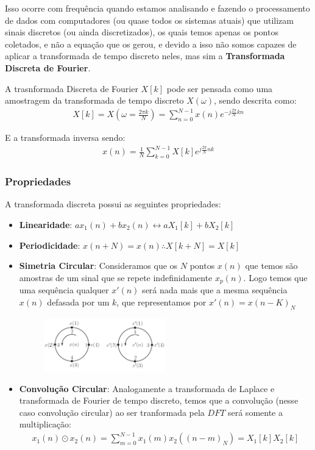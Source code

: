 \documentclass{article}
\begin{document}
Isso ocorre com frequência quando estamos analisando e fazendo o processamento de dados com computadores (ou quase todos os sistemas atuais) que utilizam sinais discretos (ou ainda discretizados), os quais temos apenas os pontos coletados, e não a equação que os gerou, e devido a isso não somos capazes de aplicar a transformada de tempo discreto neles, mas sim a \textbf{Transformada Discreta de Fourier}.

A trasnformada Discreta de Fourier $X[k]$ pode ser pensada como uma amostragem da transformada de tempo discreto $X(\omega)$, sendo descrita como:
\begin{align}
    X[k] = X\left(\omega = \frac{2\pi k}{N}\right) = \sum^{N-1}_{n = 0} x(n) e^{-j\frac{2\pi}{N}kn}
\end{align}

E a transformada inversa sendo:
\begin{align}
    x(n) = \frac{1}{N}\sum^{N-1}_{k = 0} X[k]e^{j \frac{2\pi}{N}nk}
\end{align}

\subsubsection{Propriedades}
A transformada discreta possui as seguintes propriedades:
\begin{itemize}
    \item \textbf{Linearidade}: $ax_1(n) + bx_2(n) \longleftrightarrow aX_1[k] + bX_2[k]$
    \item \textbf{Periodicidade}: $x(n+N) = x(n) \therefore X[k+N] = X[k]$
    \item \textbf{Simetria Circular}: Consideramos que os $N$ pontos $x(n)$ que temos são amostras de um sinal que se repete indefinidamente $x_p(n)$. Logo temos que uma sequência qualquer $x'(n)$ será nada mais que a mesma sequência $x(n)$ defasada por um $k$, que representamos por $x'(n) = x(n - K)_{N}$
    \begin{figure}[h]
        \centering
        \includegraphics[width=0.5\textwidth]{imgs/circular.png}
    \end{figure}
    \item \textbf{Convolução Circular}: Analogamente a transformada de Laplace e transformada de Fourier de tempo discreto, temos que a convolução (nesse caso convolução circular) ao ser tranformada pela $DFT$ será somente a multiplicação: 
    \begin{align}
        x_1(n)\odot x_2(n) = \sum^{N-1}_{m = 0}x_1(m) x_2((n-m)_{N}) = X_1[k]X_2[k]
    \end{align}
\end{itemize}
\end{document}
